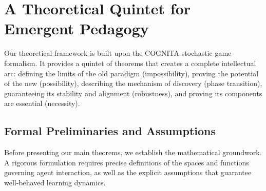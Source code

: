 \chapter{A Theoretical Quintet for Emergent Pedagogy}
\label{chap:theory}

Our theoretical framework is built upon the COGNITA stochastic game formalism. It provides a quintet of theorems that creates a complete intellectual arc: defining the limits of the old paradigm (impossibility), proving the potential of the new (possibility), describing the mechanism of discovery (phase transition), guaranteeing its stability and alignment (robustness), and proving its components are essential (necessity).

\section{Formal Preliminaries and Assumptions}
\label{sec:preliminaries}

Before presenting our main theorems, we establish the mathematical groundwork. A rigorous formulation requires precise definitions of the spaces and functions governing agent interaction, as well as the explicit assumptions that guarantee well-behaved learning dynamics.

